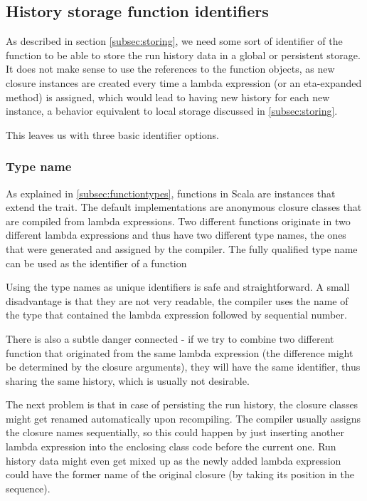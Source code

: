 \subsection{History storage function identifiers}
\label{subsec:function_identifiers}

As described in section \ref{subsec:storing}, we need some sort of identifier of the function to be able to store the run history data in a global or persistent storage. It does not make sense to use the references to the function objects, as new closure instances are created every time a lambda expression (or an eta-expanded method) is assigned, which would lead to having new history for each new instance, a behavior equivalent to local storage discussed in \ref{subsec:storing}.


This leaves us with three basic identifier options.

\subsubsection{Type name}

As explained in \ref{subsec:functiontypes}, functions in Scala are instances that extend the  trait. The default implementations are anonymous closure classes that are compiled from lambda expressions. Two different functions originate in two different lambda expressions and thus have two different type names, the ones that were generated and assigned by the compiler. The fully qualified type name can be used as the identifier of a function

Using the type names as unique identifiers is safe and straightforward. A small disadvantage is that they are not very readable, the compiler uses the name of the type that contained the lambda expression followed by sequential number. 

There is also a subtle danger connected - if we try to combine two different function that originated from the same lambda expression (the difference might be determined by the closure arguments), they will have the same identifier, thus sharing the same history, which is usually not desirable.

The next problem is that in case of persisting the run history, the closure classes might get renamed automatically upon recompiling. The compiler usually assigns the closure names sequentially, so this could happen by just inserting another lambda expression into the enclosing class code before the current one. Run history data might even get mixed up as the newly added lambda expression could have the former name of the original closure (by taking its position in the sequence).

